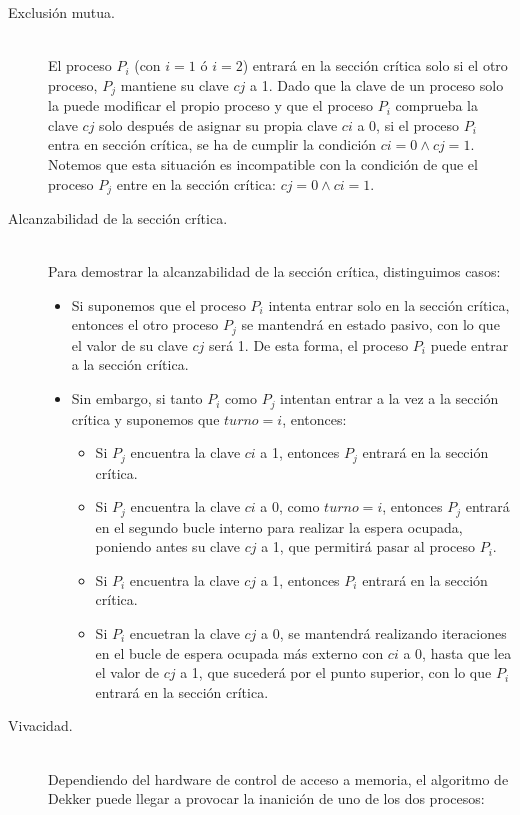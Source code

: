 \begin{description}
    \item [Exclusión mutua.]~\\
    El proceso $P_i$ (con $i = 1$ ó $i=2$) entrará en la sección crítica solo si el otro proceso, $P_j$ mantiene su clave $cj$ a 1. Dado que la clave de un proceso solo la puede modificar el propio proceso y que el proceso $P_i$ comprueba la clave $cj$ solo después de asignar su propia clave $ci$ a 0, si el proceso $P_i$ entra en sección crítica, se ha de cumplir la condición $ci = 0 \land cj = 1$. Notemos que esta situación es incompatible con la condición de que el proceso $P_j$ entre en la sección crítica: $cj = 0 \land ci = 1$.
    \item [Alcanzabilidad de la sección crítica.]~\\
    Para demostrar la alcanzabilidad de la sección crítica, distinguimos casos:
    \begin{itemize}
        \item Si suponemos que el proceso $P_i$ intenta entrar solo en la sección crítica, entonces el otro proceso $P_j$ se mantendrá en estado pasivo, con lo que el valor de su clave $cj$ será 1. De esta forma, el proceso $P_i$ puede entrar a la sección crítica.
        \item Sin embargo, si tanto $P_i$ como $P_j$ intentan entrar a la vez a la sección crítica y suponemos que $turno = i$, entonces:
            \begin{itemize}
                \item Si $P_j$ encuentra la clave $ci$ a 1, entonces $P_j$ entrará en la sección crítica.
                \item Si $P_j$ encuentra la clave $ci$ a 0, como $turno = i$, entonces $P_j$ entrará en el segundo bucle interno para realizar la espera ocupada, poniendo antes su clave $cj$ a 1, que permitirá pasar al proceso $P_i$.
                \item Si $P_i$ encuentra la clave $cj$ a 1, entonces $P_i$ entrará en la sección crítica.
                \item Si $P_i$ encuetran la clave $cj$ a 0, se mantendrá realizando iteraciones en el bucle de espera ocupada más externo con $ci$ a 0, hasta que lea el valor de $cj$ a 1, que sucederá por el punto superior, con lo que $P_i$ entrará en la sección crítica.
            \end{itemize}
    \end{itemize}

    
    \item [Vivacidad.]~\\
    Dependiendo del hardware de control de acceso a memoria, el algoritmo de Dekker puede llegar a provocar la inanición de uno de los dos procesos:


\end{description}

